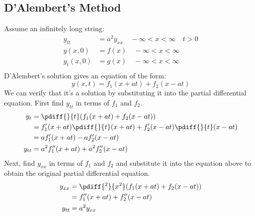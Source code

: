 \documentclass{math}
\begin{document}
\subsection*{D'Alembert's Method}
Assume an infinitely long string:
\begin{align*}
  y_{tt} &= a^2y_{xx} \quad -\infty<x<\infty \quad t>0 \\
  y(x,0) &= f(x) \quad -\infty<x<\infty \\
  y_t(x,0) &= g(x) \quad -\infty<x<\infty \\
\end{align*}
D'Alembert's solution gives an equation of the form:
\[ y(x,t) = f_1(x+at)+f_2(x-at) \]
We can verify that it's a solution by substituting it into the partial
differential equation. First find \( y_{tt} \) in terms of \( f_1 \) and
\( f_2 \).
\begin{align*}
  y_t &= \pdiff{}{t}(f_1(x+at)+f_2(x-at)) \\
  &= f_1'(x+at)\pdiff{}{t}(x+at)+f_2'(x-at)\pdiff{}{t}(x-at) \\
  &= af_1'(x+at)-af_2'(x-at) \\
  y_{tt} &= a^2f_1''(x+at)+a^2f_2''(x-at)
\end{align*}
Next, find \( y_{xx} \) in terms of \( f_1 \) and \( f_2 \) and substitute it
into the equation above to obtain the original partial differential equation.
\begin{align*}
  y_{xx} &= \pdiff{^2}{x^2}(f_1(x+at)+f_2(x-at)) \\
  &= f_1''(x+at)+f_2''(x-at) \\
  y_{tt} &= a^2y_{xx}
\end{align*}
\end{document}
